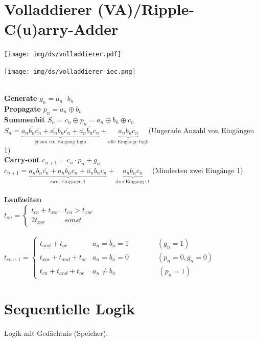 \documentclass[6pt,a4paper]{scrartcl}
\newcommand{\ol}[1]{\ensuremath{\overline{#1}}}									%
\begin{document}
\begin{multicols*}{3}
\section{Volladdierer (VA)/Ripple-C(u)arry-Adder}
\parbox{5.0cm}{ \texttt{[image: img/ds/volladdierer.pdf]} }
\hspace*{-.7cm}\parbox{5.0cm}{ \texttt{[image: img/ds/volladdierer-iec.png]} } \\
\textbf{Generate} $g_n = a_n \cdot b_n$\\
\textbf{Propagate} $p_n = a_n \oplus b_n$\\
\textbf{Summenbit} $S_n = c_n \oplus p_n= a_n \oplus b_n \oplus c_n$\\
$S_n = \underbrace{a_n\ol{b_n} \ol{c_n} + \ol{a_n}b_n\ol{c_n} + \ol{a_n}\ol{b_n}c_n}_{\text{genau ein Eingang high}} + \underbrace{a_nb_nc_n}_{\text{alle Eingänge high}}$(Ungerade Anzahl von Eingängen 1) \\
\textbf{Carry-out} $c_{n+1} = c_n \cdot p_n + g_n$\\
$c_{n+1}=\underbrace{a_nb_n\ol{c_n} + a_n\ol{b_n}c_n + \ol{a_n}b_nc_n}_{\text{zwei Eingänge 1}} + \underbrace{a_nb_nc_n}_{\text{drei Eingänge 1}}$ (Mindesten zwei Eingänge 1)
\\ \\
\textbf{Laufzeiten} \\
$t_{sn} = \begin{cases} t_{cn} + t_{xor} & t_{cn} > t_{xor} \\ 2 t_{xor} & sonst \end{cases}$\\ \\
$t_{cn+1} = 
\begin{cases}
	t_{and} + t_{or}           & a_n = b_n = 1 \qquad \qquad (g_n=1)   \\
	t_{xor} + t_{and} + t_{or} & a_n = b_n = 0 \qquad \qquad  (p_n = 0, g_n = 0) \\
	t_{cn} + t_{and} + t_{or}  & a_n \ne b_n \qquad \qquad \qquad  (p_n = 1)
\end{cases}$\\

\section{Sequentielle Logik}
Logik mit Gedächtnis (Speicher).

\end{multicols*}
\end{document}
